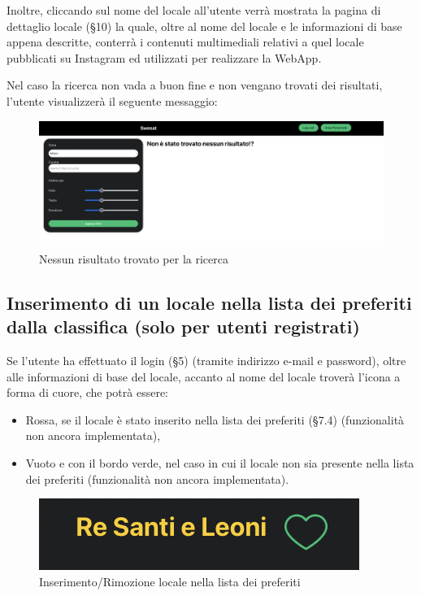 Inoltre, cliccando sul nome del locale all’utente verrà mostrata la pagina di dettaglio locale (\S{10}) la quale, oltre al nome del locale e le informazioni di base appena descritte, conterrà i contenuti multimediali relativi a quel locale pubblicati su Instagram ed utilizzati per realizzare la WebApp.

Nel caso la ricerca non vada a buon fine e non vengano trovati dei risultati, l’utente visualizzerà il seguente messaggio:

\begin{figure}[H]
\centering
\includegraphics[scale=0.3]{./images/Ricerca/ZeroRisultati.png} 
\caption{Nessun risultato trovato per la ricerca}
\end{figure}

\subsection{Inserimento di un locale nella lista dei preferiti dalla classifica (solo per utenti registrati)}

Se l’utente ha effettuato il login (\S{5}) (tramite indirizzo e-mail e password), oltre alle informazioni di base del locale, accanto al nome del locale troverà l’icona a forma di cuore, che potrà essere:

\begin{itemize}
\item Rossa, se il locale è stato inserito nella lista dei preferiti (\S{7.4}) (funzionalità non ancora implementata),
\item Vuoto e con il bordo verde, nel caso in cui il locale non sia presente nella lista dei preferiti (funzionalità non ancora implementata).
\end{itemize}

\begin{figure}[H]
\centering
\includegraphics[scale=0.6]{./images/Ricerca/Cuore.png} 
\caption{Inserimento/Rimozione locale nella lista dei preferiti}
\end{figure}

